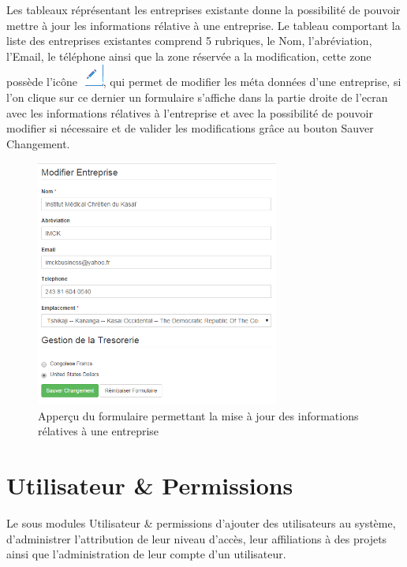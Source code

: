 \documentclass[12pt,a4paper]{report}
\begin{document}
Les tableaux réprésentant les entreprises existante donne la possibilité de pouvoir mettre à jour les informations rélative à une entreprise. Le tableau comportant la liste des entreprises existantes comprend 5 rubriques, le Nom, l'abréviation, l'Email, le téléphone ainsi que la zone réservée a la modification, cette zone possède l'icône \includegraphics[scale=0.7]{pic/EditUser.png}, qui permet de modifier les méta données d'une entreprise, si l'on clique sur ce dernier un formulaire s'affiche dans la partie droite de l'ecran avec les informations rélatives à l'entreprise et avec la possibilité de pouvoir modifier si nécessaire et de valider les modifications grâce au bouton Sauver Changement.
\begin{figure}[h]
\begin{center}
\includegraphics[width=8cm]{pic/ModEntreprise.png}
\end{center}
\caption{Apperçu du formulaire permettant la mise à jour des informations rélatives à une entreprise}
\label{Apperçu du formulaire permettant la mise à jour des informations rélatives à une entreprise}
\end{figure} 
\newpage
\section{Utilisateur \& Permissions}
Le sous modules Utilisateur \& permissions d'ajouter des utilisateurs au système, d'administrer l'attribution de leur niveau d'accès, leur affiliations à des projets ainsi que l'administration de leur compte d'un utilisateur.
\end{document}
